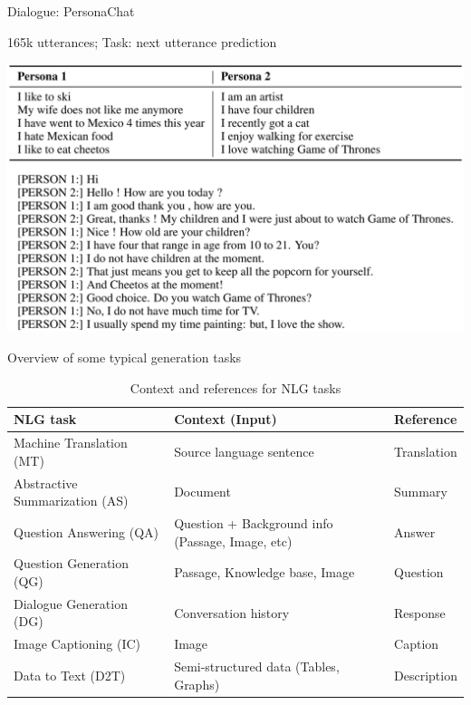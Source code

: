 \documentclass[12pt,aspectratio=169,handout]{beamer}
\begin{document}
\begin{frame}{Dialogue: PersonaChat}
	
165k utterances; Task: next utterance prediction
	
\includegraphics[width=0.9\linewidth]{img/dial1.png}


\end{frame}

\begin{frame}{Overview of some typical generation tasks}

\begin{table}
\begin{footnotesize}
\begin{tabular}{p{5cm}p{6cm}l}
\toprule
NLG task & Context (Input) & Reference \\
\midrule
Machine Translation (MT) & Source language sentence & Translation \\ 
Abstractive Summarization (AS) & Document & Summary \\
Question Answering (QA) & Question + Background info (Passage, Image, etc) & Answer \\
Question Generation (QG) & Passage, Knowledge base, Image & Question \\
Dialogue Generation (DG) & Conversation history & Response \\
Image Captioning (IC) & Image & Caption \\
Data to Text (D2T) & Semi-structured data (Tables, Graphs) & Description \\
\bottomrule
\end{tabular}
\end{footnotesize}
\caption{Context and references for NLG tasks}
\end{table}




\end{frame}
\end{document}

